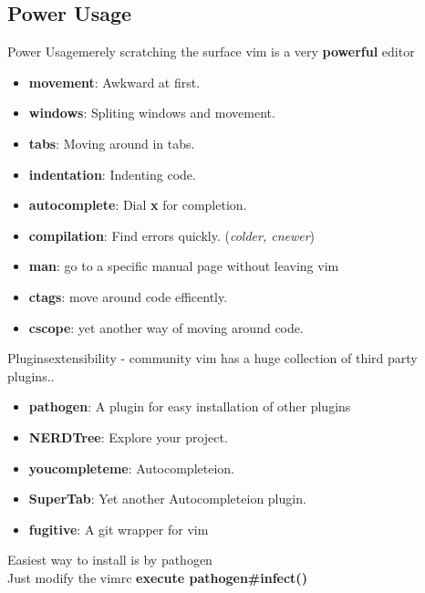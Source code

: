 \documentclass{beamer}
\begin{document}
\subsection{Power Usage}
\begin{frame}{Power Usage}{merely scratching the surface}
	vim is a very \textbf{powerful} editor \pause
	\begin{itemize}
			\item {
					\textbf{movement}: Awkward at first.
					\pause
					}
			\item {
					\textbf{windows}: Spliting windows and movement.
					\pause
					}
			\item {
					\textbf{tabs}: Moving around in tabs.
					\pause
					}
			\item {
					\textbf{indentation}: Indenting code.
					\pause
					}
			\item {
					\textbf{autocomplete}: Dial \textbf{x} for completion.
					\pause
					}
			\item {
					\textbf{compilation}: Find errors quickly. (\textit{colder, cnewer})
					\pause
					}
			\item {
					\textbf{man}: go to a specific manual page without leaving vim
					\pause
					}
			\item {
					\textbf{ctags}: move around code efficently.
					\pause
					}
			\item {
					\textbf{cscope}: yet another way of moving around code.
					}

	\end{itemize}
\end{frame}
\begin{frame}{Plugins}{extensibility - community}
	vim has a huge collection of third party plugins.. \pause
	\begin{itemize}
		\item {
				\textbf{pathogen}: A plugin for easy installation of other plugins
				\pause
				}
		\item {
				\textbf{NERDTree}: Explore your project.
				\pause
				}
		\item {
				\textbf{youcompleteme}: Autocompleteion.
				\pause
				}
		\item {
				\textbf{SuperTab}: Yet another Autocompleteion plugin.
				\pause
				}
		\item {
				\textbf{fugitive}: A git wrapper for vim
				\pause
				}
	\end{itemize}
	Easiest way to install is by \alert{pathogen}\\
	Just modify the vimrc \textbf{execute pathogen\#infect()}
\end{frame}
\end{document}
